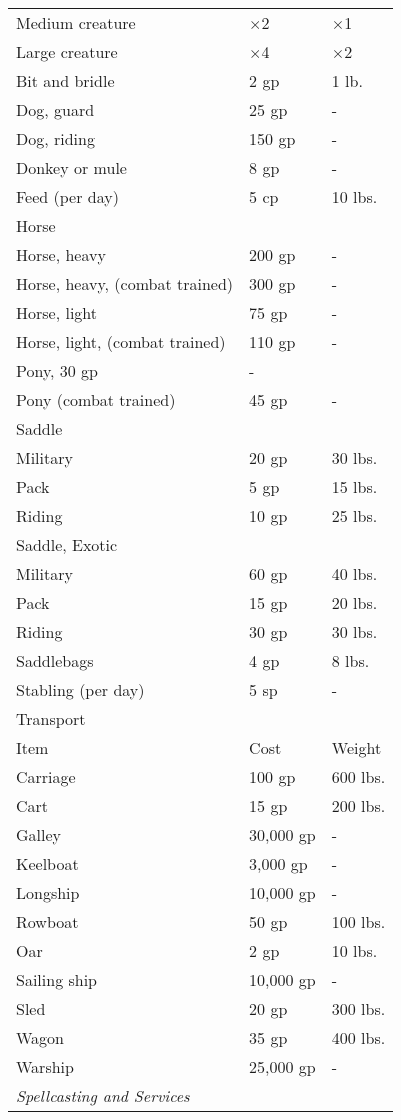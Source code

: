 \begin{table*}[]
\begin{tabular}{lll}
 Medium creature & $\times$2 & $\times$1 \\
 Large creature & $\times$4 & $\times$2 \\
 Bit and bridle & 2 gp & 1 lb. \\
 Dog, guard & 25 gp & - \\
 Dog, riding & 150 gp & - \\
 Donkey or mule & 8 gp & - \\
 Feed (per day) & 5 cp & 10 lbs. \\
 Horse  \\
 Horse, heavy & 200 gp & - \\
 Horse, heavy, (combat trained) & 300 gp & - \\
 Horse, light & 75 gp & - \\
 Horse, light, (combat trained) & 110 gp & - \\
 Pony, 30 gp & - \\
 Pony (combat trained) & 45 gp & - \\
 Saddle \\
 Military & 20 gp & 30 lbs. \\
 Pack & 5 gp & 15 lbs. \\
 Riding & 10 gp & 25 lbs. \\
 Saddle, Exotic  \\
 Military & 60 gp & 40 lbs. \\
 Pack & 15 gp & 20 lbs. \\
 Riding & 30 gp & 30 lbs. \\
 Saddlebags & 4 gp & 8 lbs. \\
 Stabling (per day) & 5 sp & -\\
Transport  \\
 Item & Cost & Weight\\
Carriage & 100 gp & 600 lbs. \\
 Cart & 15 gp & 200 lbs. \\
 Galley & 30,000 gp & - \\
 Keelboat & 3,000 gp & - \\
 Longship & 10,000 gp & - \\
 Rowboat & 50 gp & 100 lbs. \\
 Oar & 2 gp & 10 lbs. \\
 Sailing ship & 10,000 gp & - \\
 Sled & 20 gp & 300 lbs. \\
 Wagon & 35 gp & 400 lbs. \\
 Warship & 25,000 gp & -\\
\textit{Spellcasting and Services} \\

\end{tabular}
\end{table*}
